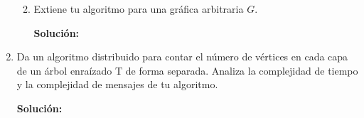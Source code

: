 \documentclass[8pt, letterpaper]{article}
\begin{document}
\begin{enumerate}
\begin{enumerate}
    \hfill\break
    \rmfamily
\item Extiene tu algoritmo para una gráfica arbitraria $G$.
  
  \hfill\break
  \ttfamily
  {\bf Solución:}

  \end{enumerate}
  \rmfamily
\item Da un algoritmo distribuido para contar el número de vértices en cada
  capa de un árbol enraízado T de forma separada. Analiza la complejidad
  de tiempo y la complejidad de mensajes de tu algoritmo.

  \hfill\break
  \ttfamily
  {\bf Solución:}

  \hfill\break    
\end{enumerate}
\end{document}
